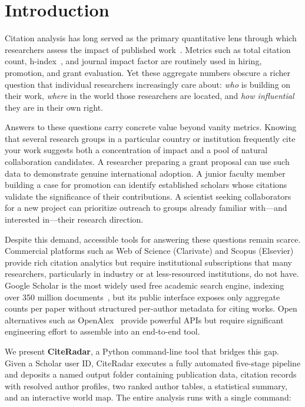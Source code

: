 \documentclass[11pt]{article}
\begin{document}
\section{Introduction}
\label{sec:intro}

Citation analysis has long served as the primary quantitative lens through
which researchers assess the impact of published work~\cite{garfield1955}.
Metrics such as total citation count, h-index~\cite{hirsch2005}, and
journal impact factor are routinely used in hiring, promotion, and grant
evaluation.
Yet these aggregate numbers obscure a richer question that individual
researchers increasingly care about: \textit{who} is building on their work,
\textit{where} in the world those researchers are located, and \textit{how
influential} they are in their own right.

Answers to these questions carry concrete value beyond vanity metrics.
Knowing that several research groups in a particular country or institution
frequently cite your work suggests both a concentration of impact and a pool
of natural collaboration candidates.
A researcher preparing a grant proposal can use such data to demonstrate
genuine international adoption.
A junior faculty member building a case for promotion can identify established
scholars whose citations validate the significance of their contributions.
A scientist seeking collaborators for a new project can prioritize outreach
to groups already familiar with—and interested in—their research direction.

Despite this demand, accessible tools for answering these questions remain
scarce.
Commercial platforms such as Web of Science (Clarivate) and Scopus (Elsevier)
provide rich citation analytics but require institutional subscriptions that
many researchers, particularly in industry or at less-resourced institutions,
do not have.
Google Scholar is the most widely used free academic search engine, indexing
over 350 million documents~\cite{martinezalvarez2023}, but its public
interface exposes only aggregate counts per paper without structured
per-author metadata for citing works.
Open alternatives such as OpenAlex~\cite{priem2022openalex} provide powerful
APIs but require significant engineering effort to assemble into an end-to-end
tool.

We present \textbf{CiteRadar}, a Python command-line tool that bridges this
gap.
Given a Scholar user ID, CiteRadar executes a fully automated five-stage
pipeline and deposits a named output folder containing publication data,
citation records with resolved author profiles, two ranked author tables,
a statistical summary, and an interactive world map.
The entire analysis runs with a single command:
\end{document}
